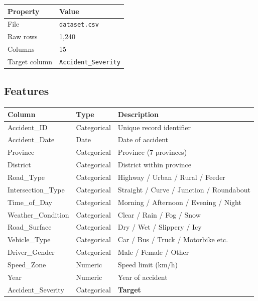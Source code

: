 \documentclass[12pt,a4paper]{article}
\begin{document}
\begin{center}
\begin{tabular}{ll}
\toprule
\textbf{Property} & \textbf{Value} \\
\midrule
File            & \texttt{dataset.csv} \\
Raw rows        & 1,240 \\
Columns         & 15 \\
Target column   & \texttt{Accident\_Severity} \\
\bottomrule
\end{tabular}
\end{center}

\subsection{Features}
\begin{longtable}{lll}
\toprule
\textbf{Column} & \textbf{Type} & \textbf{Description} \\
\midrule
\endhead
Accident\_ID       & Categorical & Unique record identifier \\
Accident\_Date     & Date        & Date of accident \\
Province           & Categorical & Province (7 provinces) \\
District           & Categorical & District within province \\
Road\_Type         & Categorical & Highway / Urban / Rural / Feeder \\
Intersection\_Type & Categorical & Straight / Curve / Junction / Roundabout \\
Time\_of\_Day      & Categorical & Morning / Afternoon / Evening / Night \\
Weather\_Condition & Categorical & Clear / Rain / Fog / Snow \\
Road\_Surface      & Categorical & Dry / Wet / Slippery / Icy \\
Vehicle\_Type      & Categorical & Car / Bus / Truck / Motorbike etc. \\
Driver\_Gender     & Categorical & Male / Female / Other \\
Speed\_Zone        & Numeric     & Speed limit (km/h) \\
Year               & Numeric     & Year of accident \\
Accident\_Severity & Categorical & \textbf{Target} \\
\bottomrule
\end{longtable}
\end{document}

